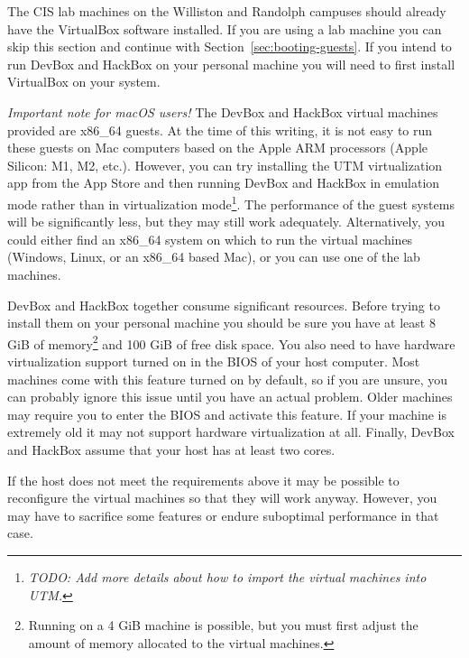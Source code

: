\documentclass{article}
\newcommand{\todo}[1]{\textit{TODO: #1}}
\begin{document}
The CIS lab machines on the Williston and Randolph campuses should already have the VirtualBox
software installed. If you are using a lab machine you can skip this section and continue with
Section~\ref{sec:booting-guests}. If you intend to run DevBox and HackBox on your personal
machine you will need to first install VirtualBox on your system.

\textit{Important note for macOS users!} The DevBox and HackBox virtual machines provided are
x86\_64 guests. At the time of this writing, it is not easy to run these guests on Mac computers
based on the Apple ARM processors (Apple Silicon: M1, M2, etc.). However, you can try installing
the UTM virtualization app from the App Store and then running DevBox and HackBox in emulation
mode rather than in virtualization mode\footnote{\todo{Add more details about how to import the
virtual machines into UTM.}}. The performance of the guest systems will be significantly less,
but they may still work adequately. Alternatively, you could either find an x86\_64 system on
which to run the virtual machines (Windows, Linux, or an x86\_64 based Mac), or you can use one
of the lab machines.

DevBox and HackBox together consume significant resources. Before trying to install them on your
personal machine you should be sure you have at least 8 GiB of memory\footnote{Running on a 4
GiB machine is possible, but you must first adjust the amount of memory allocated to the virtual
machines.} and 100 GiB of free disk space. You also need to have hardware virtualization support
turned on in the BIOS of your host computer. Most machines come with this feature turned on by
default, so if you are unsure, you can probably ignore this issue until you have an actual
problem. Older machines may require you to enter the BIOS and activate this feature. If your
machine is extremely old it may not support hardware virtualization at all. Finally, DevBox and
HackBox assume that your host has at least two cores.

If the host does not meet the requirements above it may be possible to reconfigure the virtual
machines so that they will work anyway. However, you may have to sacrifice some features or
endure suboptimal performance in that case.
\end{document}

